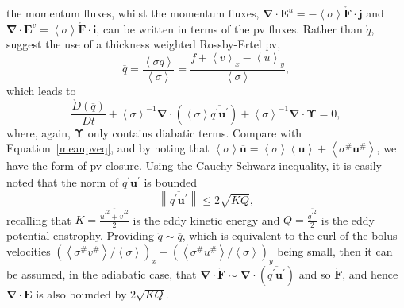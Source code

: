 \documentclass[12pt,a4paper]{report}
\newcommand*\thkmean[1]{\overline{#1}}
\newcommand*\thkres[1]{{#1}^{\prime}}
\newcommand*\nthkmean[1]{\left\langle{#1}\right\rangle}
\newcommand*\nthkres[1]{{#1}^{\#}}
\newcommand*\spec[1]{\mathring{#1}}
\newcommand*\equref[1]{Equation~\eqref{#1}}
\begin{document}
                      the momentum fluxes, whilst the momentum fluxes, ${\boldsymbol{\nabla}\cdot\boldsymbol{E}^u = -\nthkmean{\sigma} \spec{\boldsymbol{F}}\cdot\boldsymbol{j}}$ and                      ${\boldsymbol{\nabla}\cdot\boldsymbol{E}^v = \nthkmean{\sigma} \spec{\boldsymbol{F}}\cdot\boldsymbol{i}}$,
                      can be written in terms of the \gls{pv} fluxes.
                      Rather than $\spec{q}$, \cite{greatbatch1998exploring} suggest
                      the use of a thickness weighted Rossby-Ertel \gls{pv},
                      \begin{equation}
                      \thkmean{q}=\frac{\nthkmean{\sigma q}}{\nthkmean{\sigma}}=\frac{f+\nthkmean{v}_{x}-\nthkmean{u}_{y}}{\nthkmean{\sigma}},
                      \end{equation}
                      which leads  to
                      \begin{equation}
                      \frac{\spec{D} \left( \thkmean{q}\right)}{D t}
                      + \nthkmean{\sigma}^{-1}\boldsymbol{\nabla}\cdot\left(\nthkmean{\sigma}\thkmean{\thkres{q} \thkres{\boldsymbol{u}}}\right)
                      +\nthkmean{\sigma}^{-1}\boldsymbol{\nabla}\cdot\boldsymbol{\Upsilon}=0 ,
                      \end{equation}
                      where, again, $\boldsymbol{\Upsilon}$ only contains
                      diabatic terms. Compare with \equref{meanpveq}, and by noting that
                       ${\nthkmean{\sigma}\thkmean{\boldsymbol{u}}=\nthkmean{\sigma}\nthkmean{\boldsymbol{u}} + \nthkmean{\nthkres{\sigma}\nthkres{\boldsymbol{u}}}}$, we have the 
                       \cite{greatbatch1998exploring} form of \gls{pv} closure.
                       Using the Cauchy-Schwarz inequality, it is easily noted that
                       the norm of $\thkmean{\thkres{q} \thkres{\boldsymbol{u}}}$ is bounded
                       \begin{equation}
                       \left\|\thkmean{\thkres{q} \thkres{\boldsymbol{u}}}\right\|
                       \leq 2\sqrt{KQ},
                       \end{equation}
                       recalling that $K = \frac{\thkmean{{\thkres{u}}^{2} +
                       	{\thkres{v}}^{2}}}{2}$ is the eddy kinetic energy and $Q =
                        \frac{\thkmean{{\thkres{q}}^{2}}}{2}$ is the eddy potential enstrophy.
                       Providing $\spec{q} \sim \thkmean{q}$, which is equivalent 
                       to the  curl of the bolus velocities $\left(\nthkmean{\nthkres{\sigma}\nthkres{v}}/\nthkmean{\sigma}\right)_{x}-\left(\nthkmean{\nthkres{\sigma}\nthkres{u}}/\nthkmean{\sigma}\right)_{y}$ 
                       being small, then it can be assumed, in the adiabatic case,
                       that $\boldsymbol{\nabla}\cdot\spec{\boldsymbol{F}} \sim \boldsymbol{\nabla}\cdot\left(\thkmean{\thkres{q} \thkres{\boldsymbol{u}}}\right)$ and so $\spec{\boldsymbol{F}}$,
                       and hence $\boldsymbol{\nabla}\cdot\boldsymbol{E}$
                       is also bounded by  $2\sqrt{KQ}$.
                       
\end{document}
